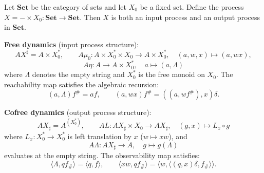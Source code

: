 Let $\mathbf{Set}$ be the category of sets and let $X_0$ be a fixed set. Define the process $X = - \times X_0: \mathbf{Set} \to \mathbf{Set}$. Then $X$ is both an input process and an output process in $\mathbf{Set}$.

\textbf{Free dynamics} (input process structure):
$$AX^{\sharp} = A \times X_0^*, \qquad A\mu_0: A \times X_0^* \times X_0 \to A \times X_0^*, \quad (a, w, x) \mapsto (a, wx),$$
$$A\eta: A \to A \times X_0^*, \quad a \mapsto (a, \Lambda)$$
where $\Lambda$ denotes the empty string and $X_0^*$ is the free monoid on $X_0$. The reachability map satisfies the algebraic recursion:
$$(a, \Lambda) f^{\#} = a f, \qquad (a, wx) f^{\#} = ((a, w f^{\#}), x) \delta.$$

\textbf{Cofree dynamics} (output process structure):
$$AX_{\sharp} = A^{(X_0^*)}, \qquad AL: AX_{\sharp} \times X_0 \to AX_{\sharp}, \quad (g, x) \mapsto L_x \circ g$$
where $L_x: X_0^* \to X_0^*$ is left translation by $x$ ($w \mapsto xw$), and
$$A\Lambda: AX_{\sharp} \to A, \quad g \mapsto g(\Lambda)$$
evaluates at the empty string. The observability map satisfies:
$$\langle \Lambda, q f_{\#} \rangle = \langle q, f \rangle, \qquad \langle xw, q f_{\#} \rangle = \langle w, \langle (q, x)\delta, f_{\#} \rangle \rangle.$$
